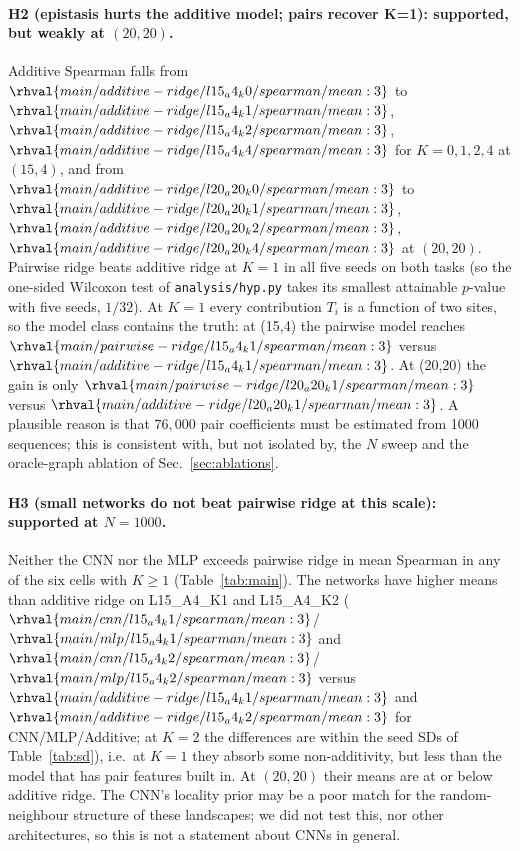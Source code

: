 \paragraph{H2 (epistasis hurts the additive model; pairs recover K=1): supported, but weakly at $(20,20)$.} Additive Spearman falls from $\rhval{main/additive-ridge/l15_a4_k0/spearman/mean:3}$ to $\rhval{main/additive-ridge/l15_a4_k1/spearman/mean:3}$, $\rhval{main/additive-ridge/l15_a4_k2/spearman/mean:3}$, $\rhval{main/additive-ridge/l15_a4_k4/spearman/mean:3}$ for $K=0,1,2,4$ at $(15,4)$, and from $\rhval{main/additive-ridge/l20_a20_k0/spearman/mean:3}$ to $\rhval{main/additive-ridge/l20_a20_k1/spearman/mean:3}$, $\rhval{main/additive-ridge/l20_a20_k2/spearman/mean:3}$, $\rhval{main/additive-ridge/l20_a20_k4/spearman/mean:3}$ at $(20,20)$. Pairwise ridge beats additive ridge at $K=1$ in all five seeds on both tasks (so the one-sided Wilcoxon test of \texttt{analysis/hyp.py} takes its smallest attainable $p$-value with five seeds, $1/32$). At $K=1$ every contribution $T_i$ is a function of two sites, so the model class contains the truth: at (15,4) the pairwise model reaches $\rhval{main/pairwise-ridge/l15_a4_k1/spearman/mean:3}$ versus $\rhval{main/additive-ridge/l15_a4_k1/spearman/mean:3}$. At (20,20) the gain is only $\rhval{main/pairwise-ridge/l20_a20_k1/spearman/mean:3}$ versus $\rhval{main/additive-ridge/l20_a20_k1/spearman/mean:3}$. A plausible reason is that $76{,}000$ pair coefficients must be estimated from 1000 sequences; this is consistent with, but not isolated by, the $N$ sweep and the oracle-graph ablation of Sec.~\ref{sec:ablations}.

\paragraph{H3 (small networks do not beat pairwise ridge at this scale): supported at $N=1000$.} Neither the CNN nor the MLP exceeds pairwise ridge in mean Spearman in any of the six cells with $K\ge1$ (Table~\ref{tab:main}). The networks have higher means than additive ridge on L15\_A4\_K1 and L15\_A4\_K2 ($\rhval{main/cnn/l15_a4_k1/spearman/mean:3}$/$\rhval{main/mlp/l15_a4_k1/spearman/mean:3}$ and $\rhval{main/cnn/l15_a4_k2/spearman/mean:3}$/$\rhval{main/mlp/l15_a4_k2/spearman/mean:3}$ versus $\rhval{main/additive-ridge/l15_a4_k1/spearman/mean:3}$ and $\rhval{main/additive-ridge/l15_a4_k2/spearman/mean:3}$ for CNN/MLP/Additive; at $K=2$ the differences are within the seed SDs of Table~\ref{tab:sd}), i.e.\ at $K=1$ they absorb some non-additivity, but less than the model that has pair features built in. At $(20,20)$ their means are at or below additive ridge. The CNN's locality prior may be a poor match for the random-neighbour structure of these landscapes; we did not test this, nor other architectures, so this is not a statement about CNNs in general.

